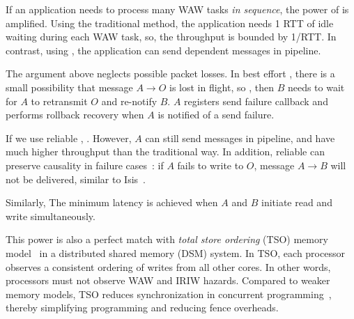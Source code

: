 

If an application needs to process many WAW tasks \emph{in sequence}, the power of \sys{} is amplified. Using the traditional method, the application needs 1 RTT of idle waiting during each WAW task, so, the throughput is bounded by 1/RTT. In contrast, using \sys{}, the application can send dependent messages in pipeline. %

The argument above neglects possible packet losses.
In best effort \sys{}, there is a small possibility that message $A \rightarrow O$ is lost in flight, so , then $B$ needs to wait for $A$ to retransmit $O$ and re-notify $B$.
$A$ registers send failure callback and performs rollback recovery when $A$ is notified of a send failure.

If we use reliable \sys{}, . However, $A$ can still send messages in pipeline, and have much higher throughput than the traditional way.
In addition, reliable \sys can preserve causality in failure cases~\cite{birman1994response}: if $A$ fails to write to $O$, message $A \rightarrow B$ will not be delivered, similar to Isis~\cite{birman1984overview}.

Similarly,  The minimum latency is achieved when $A$ and $B$ initiate read and write simultaneously.

This power is also a perfect match with \textit{total store ordering} (TSO) memory model~\cite{sewell2010x86} in a distributed shared memory (DSM) system. In TSO, each processor observes a consistent ordering of writes from all other cores. In other words, processors must not observe WAW and IRIW hazards.
Compared to weaker memory models, TSO reduces synchronization in concurrent programming~\cite{morrison2013fast,tassarotti2015verifying}, thereby simplifying programming and reducing fence overheads.


